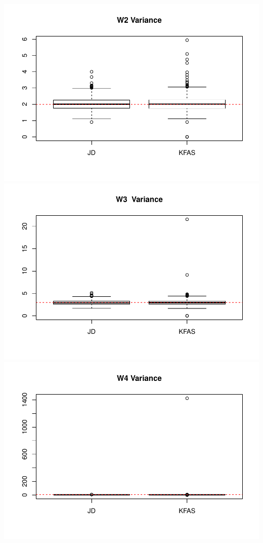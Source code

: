 \documentclass[]{article}
\begin{document}
\includegraphics{simulation_test_files/figure-latex/simulate_sae-5.pdf}
\includegraphics{simulation_test_files/figure-latex/simulate_sae-6.pdf}
\includegraphics{simulation_test_files/figure-latex/simulate_sae-7.pdf}
\end{document}
